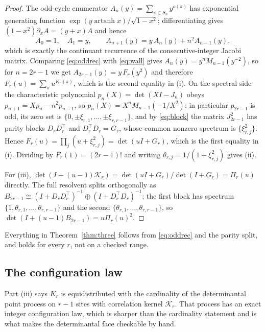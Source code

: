 \documentclass[11pt,a4paper]{article}
\theoremstyle{plain}
\theoremstyle{definition}
\theoremstyle{remark}
\DeclareMathOperator{\artanh}{artanh}
\begin{document}
\begin{proof}
The odd-cycle enumerator $A_n(y)=\sum_{\pi\in S_n}y^{o(\pi)}$ has exponential
generating function $\exp(y\artanh x)/\sqrt{1-x^2}$; differentiating gives
$(1-x^2)\partial_xA=(y+x)A$ and hence
\begin{equation}\label{eq:oddrec}
  A_0=1,\quad A_1=y,\qquad A_{n+1}(y)=y\,A_n(y)+n^2A_{n-1}(y),
\end{equation}
which is exactly the continuant recurrence of the consecutive-integer Jacobi
matrix. Comparing \eqref{eq:oddrec} with \eqref{eq:wall} gives
$A_n(y)=y^nM_{n-1}(y^{-2})$, so for $n=2r-1$ we get $A_{2r-1}(y)=y\,F_r(y^2)$
and therefore $F_r(u)=\sum_\pi u^{K_r(\pi)}$, which is the second equality in
(i). On the spectral side the characteristic polynomial $p_n(X)=\det(XI-J_n)$
obeys $p_{n+1}=Xp_n-n^2p_{n-1}$, so $p_n(X)=X^nM_{n-1}(-1/X^2)$; in particular
$p_{2r-1}$ is odd, its zero set is $\{0,\pm\xi_{r,1},\dots,\pm\xi_{r,r-1}\}$,
and by \eqref{eq:block} the matrix $J_{2r-1}^2$ has parity blocks $D_rD_r^\top$
and $D_r^\top D_r=G_r$, whose common nonzero spectrum is
$\{\xi_{r,j}^2\}$. Hence $F_r(u)=\prod_j(u+\xi_{r,j}^2)=\det(uI+G_r)$, which is
the first equality in (i). Dividing by $F_r(1)=(2r-1)!$ and writing
$\theta_{r,j}=1/(1+\xi_{r,j}^2)$ gives (ii).

For (iii), $\det(I+(u-1)\mathcal K_r)=\det(uI+G_r)/\det(I+G_r)=\Pi_r(u)$
directly. The full resolvent splits orthogonally as
$B_{2r-1}\cong(I+D_rD_r^\top)^{-1}\oplus(I+D_r^\top D_r)^{-1}$; the first block
has spectrum $\{1,\theta_{r,1},\dots,\theta_{r,r-1}\}$ and the second
$\{\theta_{r,1},\dots,\theta_{r,r-1}\}$, so
$\det(I+(u-1)B_{2r-1})=u\Pi_r(u)^2$.
\end{proof}

Everything in Theorem~\ref{thm:three} follows from \eqref{eq:oddrec} and the
parity split, and holds for every $r$, not on a checked range.

\subsection{The configuration law}\label{sec:config}

Part (iii) says $K_r$ is equidistributed with the cardinality of the
determinantal point process on $r-1$ sites with correlation kernel
$\mathcal K_r$. That process has an exact integer configuration law, which is
sharper than the cardinality statement and is what makes the determinantal face
checkable by hand.
\end{document}

